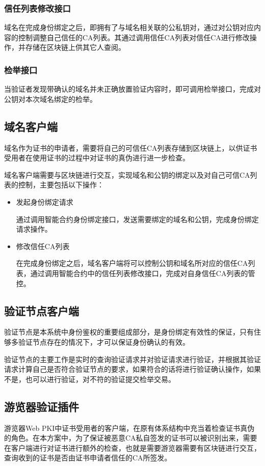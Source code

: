 \subsubsection{信任列表修改接口}

域名在完成身份绑定之后，即拥有了与域名相关联的公私钥对，通过对公钥对应内容的控制调整自己信任的CA列表。其通过调用信任CA列表对信任CA进行修改操作，并存储在区块链上供其它人查阅。


\subsubsection{检举接口}

当验证者发现带确认的域名并未正确放置验证内容时，即可调用检举接口，完成对公钥对本次域名绑定的检举。

\subsection{域名客户端}

域名作为证书的申请者，需要将自己的可信任CA列表存储到区块链上，以供证书受用者在使用证书的过程中对证书的真伪进行进一步检查。

域名客户端需要与区块链进行交互，实现域名和公钥的绑定以及对自己可信CA列表的控制，主要包括以下操作：

\begin{itemize}
	\item 

	发起身份绑定请求

	通过调用智能合约身份绑定接口，发送需要绑定的域名和公钥，完成身份绑定请求操作。

	\item 

	修改信任CA列表

	在完成身份绑定之后，域名客户端将可以控制公钥和域名所对应的信任CA列表，通过调用智能合约中的信任列表修改接口，完成对自身信任CA列表的管控。


\end{itemize}

\subsection{验证节点客户端}

验证节点是本系统中身份鉴权的重要组成部分，是身份绑定有效性的保证，只有住够多验证节点存在的情况下，才可以保证身份确认的有效。

验证节点的主要工作是实时的查询验证请求并对验证请求进行验证，并根据其验证请求计算自己是否符合验证节点的要求，如果符合的话将进行验证确认操作，如果不是，也可以进行验证，对不符的验证提交检举交易。


\subsection{游览器验证插件}


游览器Web PKI中证书受用者的客户端，在原有体系结构中充当着检查证书真伪的角色。在本方案中，为了保证被恶意CA私自签发的证书可以被识别出来，需要在客户端进行对证书进行额外的检查，也就是需要游览器需要有区块链进行交互，查询收到的证书是否由证书申请者信任的CA所签发。


